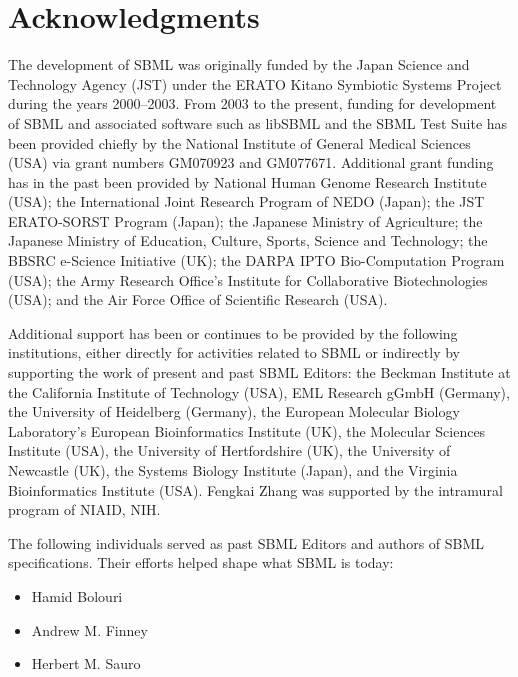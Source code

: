 
\section{Acknowledgments}
\label{sec:acknowledgements}
\label{sec:acknowledgments}

The development of SBML was originally funded by the Japan Science
and Technology Agency (JST) under the ERATO Kitano Symbiotic
Systems Project during the years 2000--2003.  From 2003 to the
present, funding for development of SBML and associated software
such as libSBML and the SBML Test Suite has been provided chiefly
by the National Institute of General Medical Sciences (USA) via
grant numbers GM070923 and GM077671.  Additional grant funding has
in the past been provided by National Human Genome Research
Institute (USA); the International Joint Research Program of NEDO
(Japan); the JST ERATO-SORST Program (Japan); the Japanese
Ministry of Agriculture; the Japanese Ministry of Education,
Culture, Sports, Science and Technology; the BBSRC e-Science
Initiative (UK); the DARPA IPTO Bio-Computation Program (USA); the
Army Research Office's Institute for Collaborative Biotechnologies
(USA); and the Air Force Office of Scientific Research (USA).

Additional support has been or continues to be provided by the
following institutions, either directly for activities related to
SBML or indirectly by supporting the work of present and past SBML
Editors: the Beckman Institute at the California Institute of
Technology (USA), EML Research gGmbH (Germany), the University of
Heidelberg (Germany), the European Molecular Biology Laboratory's
European Bioinformatics Institute (UK), the Molecular Sciences
Institute (USA), the University of Hertfordshire (UK), the
University of Newcastle (UK), the Systems Biology Institute
(Japan), and the Virginia Bioinformatics Institute (USA).  Fengkai
Zhang was supported by the intramural program of NIAID, NIH.

The following individuals served as past SBML Editors and authors
of SBML specifications.  Their efforts helped shape what SBML is
today:
\begin{itemize}\setlength{\parskip}{-0.2ex}

\item Hamid Bolouri
\item Andrew M. Finney
\item Herbert M. Sauro

\end{itemize}

